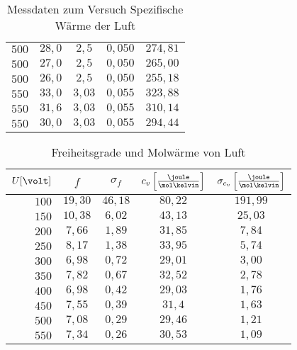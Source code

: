 \documentclass[12pt, a4paper, twoside]{scrartcl}
\begin{document}
\begin{table} [h]
\begin{tabular}{|r|c|c|c|c|}
  $ 500$ & $28,0$ & $ 2,5$ & $ 0,050$ & $ 274,81$   \\
  $ 500$ & $27,0$ & $ 2,5$ & $ 0,050$ & $ 265,00$   \\
  $ 500$ & $26,0$ & $ 2,5$ & $ 0,050$ & $ 255,18$   \\ \hline
  $ 550$ & $33,0$ & $ 3,03$ & $ 0,055$ & $ 323,88$   \\
  $ 550$ & $31,6$ & $ 3,03$ & $ 0,055$ & $ 310,14$   \\
  $ 550$ & $30,0$ & $ 3,03$ & $ 0,055$ & $ 294,44$   \\ 
  \hline
 \end{tabular} 
 \caption{\label{tab:spezwaerme}Messdaten zum Versuch Spezifische Wärme der Luft}
\end{table}



\begin{table} [h]
\centering
\begin{tabular}{|r|c|c|c|c|}
	\hline
   $ U [\volt]$ & $ f $ & $ \sigma_f$ & $ c_v\left[\frac{\joule}{\mol\kelvin}\right]$ & $\sigma_{c_v}\left[\frac{\joule}{\mol\kelvin}\right]$  \\
   \hline\hline
  $ 100$ & $19,30$ & $ 46,18$ & $ 80,22$ & $191,99$   \\ \hline
  $ 150$ & $10,38$ & $ 6,02$ & $ 43,13$ & $25,03$   \\ \hline
  $ 200$ & $7,66$ & $ 1,89$ & $ 31,85$ & $7,84$   \\ \hline
  $ 250$ & $8,17$ & $ 1,38$ & $ 33,95$ & $5,74$   \\ \hline 
  $ 300$ & $6,98$ & $ 0,72$ & $ 29,01$ & $3,00$   \\ \hline
  $ 350$ & $7,82$ & $ 0,67$ & $ 32,52$ & $2,78$   \\ \hline 
  $ 400$ & $6,98$ & $ 0,42$ & $ 29,03$ & $ 1,76$   \\ \hline
  $ 450$ & $7,55$ & $ 0,39$ & $ 31,4$ & $ 1,63$   \\ \hline
  $ 500$ & $7,08$ & $ 0,29$ & $ 29,46$ & $ 1,21$   \\ \hline
  $ 550$ & $7,34$ & $ 0,26$ & $ 30,53$ & $ 1,09$   \\ \hline
  
 \end{tabular} 
 \caption{\label{tab:fgrade}Freiheitsgrade und Molwärme von Luft}
\end{table}
\end{document}
